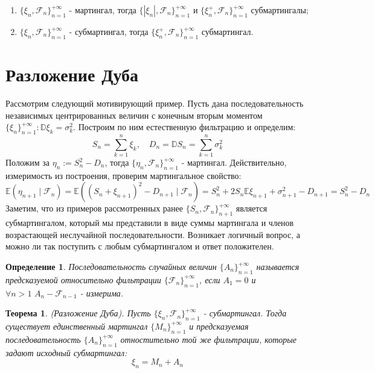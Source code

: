 \documentclass[12pt,a4paper]{article} %
\newtheorem{theorem}{Теорема}
\newtheorem{definition}{Определение}
\newcommand{\E}{\mathbb{E}}
\newcommand{\D}{\mathbb{D}}
\newcommand{\F}{\mathcal{F}}
\begin{document}
	\begin{enumerate}
		\item $\{\xi_n,\F_n\}_{n=1}^{+\infty}$ - мартингал, тогда $\{|\xi_n|,\F_n\}_{n=1}^{+\infty}$ и $\{\xi_n^{+},\F_n\}_{n=1}^{+\infty}$ субмартингалы;
		\item $\{\xi_n,\F_n\}_{n=1}^{+\infty}$ - субмартингал, тогда $\{\xi_n^{+},\F_n\}_{n=1}^{+\infty}$ субмартингал.
	\end{enumerate}
	\section{Разложение Дуба}
	Рассмотрим следующий мотивирующий пример. Пусть дана последовательность независимых центрированных величин с конечным вторым моментом $\{\xi_n\}_{n=1}^{+\infty}:\D\xi_k=\sigma_k^2$. Построим по ним естественную фильтрацию и определим:
	$$S_n=\sum_{k=1}^n\xi_k,\quad D_n=\D S_n=\sum_{k=1}^n\sigma_k^2$$
	Положим за $\eta_n:=S_n^2-D_n$, тогда $\{\eta_n,\F_n\}_{n=1}^{+\infty}$ - мартингал. Действительно, измеримость из построения, проверим мартингальное свойство:
	$$\E(\eta_{n+1}\mid\F_n)=\E((S_n+\xi_{n+1})^2-D_{n+1}\mid\F_n)=S_n^2+2S_n\E\xi_{n+1}+\sigma_{n+1}^2-D_{n+1}=S_n^2-D_n$$
	Заметим, что из примеров рассмотренных ранее $\{S_n,\F_n\}_{n+1}^{+\infty}$ является субмартингалом, который мы представили в виде суммы мартингала и членов возрастающей неслучайной последовательности. Возникает логичный вопрос, а можно ли так поступить с любым субмартингалом и ответ положителен.
	\begin{definition}
		Последовательность случайных величин $\{A_n\}_{n=1}^{+\infty}$ называется предсказуемой относительно фильтрации $\{\F_n\}_{n=1}^{+\infty}$, если $A_1=0$ и $\forall n>1\,\,A_n - \F_{n-1}$ - измерима.
	\end{definition}
	\begin{theorem}
		(Разложение Дуба). Пусть $\{\xi_n,\F_n\}_{n=1}^{+\infty}$ - субмартингал. Тогда существует единственный мартингал $\{M_n\}_{n=1}^{+\infty}$ и предсказуемая последовательность $\{A_n\}_{n=1}^{+\infty}$ отностительно той же фильтрации, которые задают исходный субмартингал:
		$$\xi_n=M_n+A_n$$
	\end{theorem}
\end{document}

